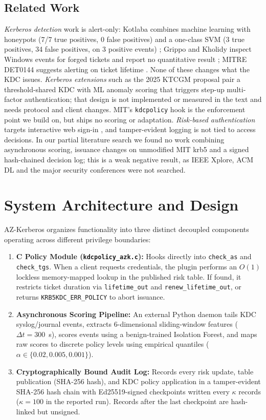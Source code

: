 \documentclass[conference]{IEEEtran}
\begin{document}
\subsection{Related Work}
\textit{Kerberos detection} work is alert-only: Kotlaba combines machine learning with honeypots (7/7 true positives, 0 false positives) \cite{kotlaba2020icissp} and a one-class SVM (3 true positives, 34 false positives, on 3 positive events) \cite{kotlaba2021icissp}; Grippo and Kholidy inspect Windows events for forged tickets and report no quantitative result \cite{grippo2023kerberos}; MITRE DET0144 suggests alerting on ticket lifetime \cite{mitredet0144}. None of these changes what the KDC issues. \textit{Kerberos extensions} such as the 2025 KTCGM proposal \cite{ktcgm2025} pair a threshold-shared KDC with ML anomaly scoring that triggers step-up multi-factor authentication; that design is not implemented or measured in the text and needs protocol and client changes. MIT's \texttt{kdcpolicy} hook \cite{k5wikipolicy} is the enforcement point we build on, but ships no scoring or adaptation. \textit{Risk-based authentication} targets interactive web sign-in \cite{wiefling2022tops}, and tamper-evident logging \cite{crosby2009usenix} is not tied to access decisions. In our partial literature search we found no work combining asynchronous scoring, issuance changes on unmodified MIT krb5 and a signed hash-chained decision log; this is a weak negative result, as IEEE Xplore, ACM DL and the major security conferences were not searched.

\section{System Architecture and Design}
AZ-Kerberos organizes functionality into three distinct decoupled components operating across different privilege boundaries:
\begin{enumerate}
    \item \textbf{C Policy Module (\texttt{kdcpolicy\_azk.c}):} Hooks directly into \texttt{check\_as} and \texttt{check\_tgs}. When a client requests credentials, the plugin performs an $O(1)$ lockless memory-mapped lookup in the published risk table. If found, it restricts ticket duration via \texttt{lifetime\_out} and \texttt{renew\_lifetime\_out}, or returns \texttt{KRB5KDC\_ERR\_POLICY} to abort issuance.
    \item \textbf{Asynchronous Scoring Pipeline:} An external Python daemon tails KDC syslog/journal events, extracts 6-dimensional sliding-window features ($\Delta t = 300$~s), scores events using a benign-trained Isolation Forest, and maps raw scores to discrete policy levels using empirical quantiles ($\alpha \in \{0.02, 0.005, 0.001\}$).
    \item \textbf{Cryptographically Bound Audit Log:} Records every risk update, table publication (SHA-256 hash), and KDC policy application in a tamper-evident SHA-256 hash chain with Ed25519-signed checkpoints written every $\kappa$ records ($\kappa = 100$ in the reported run). Records after the last checkpoint are hash-linked but unsigned.
\end{enumerate}
\end{document}
